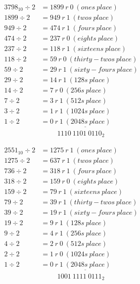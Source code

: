 \documentclass{article}
\begin{document}
\begin{align*}
3798_{10} \div 2    &= 1899\ r\ 0\ (ones\ place) \\
1899 \div 2         &= 949\ r\ 1\ (twos\ place) \\
949 \div 2          &= 474\ r\ 1\ (fours\ place) \\
474 \div 2          &= 237\ r\ 0\ (eights\ place) \\
237 \div 2          &= 118\ r\ 1\ (sixteens\ place) \\
118 \div 2          &= 59\ r\ 0\ (thirty-twos\ place) \\
59 \div 2           &= 29\ r\ 1\ (sixty-fours\ place) \\
29 \div 2           &= 14\ r\ 1\ (128s\ place) \\
14 \div 2           &= 7\ r\ 0\ (256s\ place) \\
7 \div 2            &= 3\ r\ 1\ (512s\ place) \\
3 \div 2            &= 1\ r\ 1\ (1024s\ place) \\
1 \div 2            &= 0\ r\ \underline{1\ (2048s\ place)} \\
                    &\hspace{1cm}1110\ 1101\ 0110_2
\end{align*}

\begin{align*}
2551_{10} \div 2    &= 1275\ r\ 1\ (ones\ place) \\
1275 \div 2         &= 637\ r\ 1\ (twos\ place) \\
736 \div 2          &= 318\ r\ 1\ (fours\ place) \\
318 \div 2          &= 159\ r\ 0\ (eights\ place) \\
159 \div 2          &= 79\ r\ 1\ (sixteens\ place) \\
79 \div 2           &= 39\ r\ 1\ (thirty-twos\ place) \\
39 \div 2           &= 19\ r\ 1\ (sixty-fours\ place) \\
19 \div 2           &= 9\ r\ 1\ (128s\ place) \\
9 \div 2            &= 4\ r\ 1\ (256s\ place) \\
4 \div 2            &= 2\ r\ 0\ (512s\ place) \\
2 \div 2            &= 1\ r\ 0\ (1024s\ place) \\
1 \div 2            &= 0\ r\ \underline{1\ (2048s\ place)} \\
                    &\hspace{1cm}1001\ 1111\ 0111_2
\end{align*}
\end{document}
